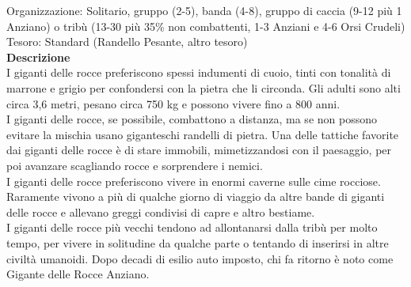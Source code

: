 \begin{multicols}{2}
Organizzazione: Solitario, gruppo (2-5), banda (4-8), gruppo di caccia (9-12 più 1 Anziano) o tribù (13-30 più 35\% non combattenti, 1-3 Anziani e 4-6 Orsi Crudeli)\\
Tesoro: Standard (Randello Pesante, altro tesoro)\\
\textbf{Descrizione}\\
I giganti delle rocce preferiscono spessi indumenti di cuoio, tinti con tonalità di marrone e grigio per confondersi con la pietra che li circonda. Gli adulti sono alti circa 3,6 metri, pesano circa 750 kg e possono vivere fino a 800 anni.\\
I giganti delle rocce, se possibile, combattono a distanza, ma se non possono evitare la mischia usano giganteschi randelli di pietra. Una delle tattiche favorite dai giganti delle rocce è di stare immobili, mimetizzandosi con il paesaggio, per poi avanzare scagliando rocce e sorprendere i nemici.\\

I giganti delle rocce preferiscono vivere in enormi caverne sulle cime rocciose. Raramente vivono a più di qualche giorno di viaggio da altre bande di giganti delle rocce e allevano greggi condivisi di capre e altro bestiame.\\

I giganti delle rocce più vecchi tendono ad allontanarsi dalla tribù per molto tempo, per vivere in solitudine da qualche parte o tentando di inserirsi in altre civiltà umanoidi. Dopo decadi di esilio auto imposto, chi fa ritorno è noto come Gigante delle Rocce Anziano.\\


\end{multicols}
